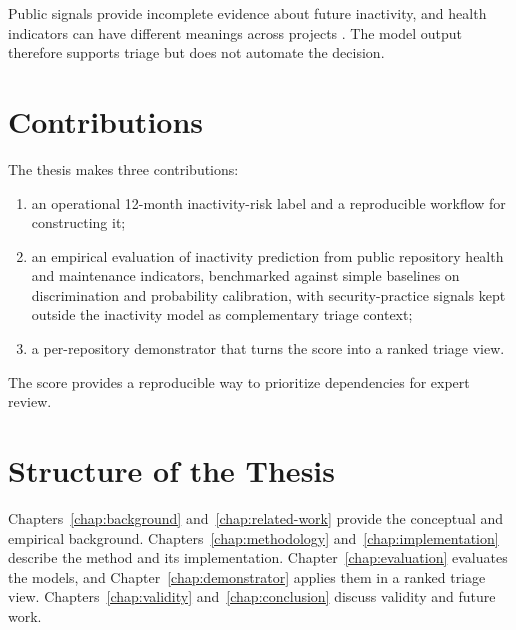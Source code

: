 Public signals provide incomplete evidence about future inactivity, and health
indicators can have different meanings across projects
\cite{yehudi2023contextfree}. The model output therefore supports triage but does
not automate the decision.

\section{Contributions}
\label{sec:intro-contributions}

The thesis makes three contributions:

\begin{enumerate}
    \item an operational 12-month inactivity-risk label and a reproducible workflow for constructing it;
    \item an empirical evaluation of inactivity prediction from public repository health and maintenance indicators, benchmarked against simple baselines on discrimination and probability calibration, with security-practice signals kept outside the inactivity model as complementary triage context;
    \item a per-repository demonstrator that turns the score into a ranked triage view.
\end{enumerate}

The score provides a reproducible way to prioritize dependencies for expert
review.

\section{Structure of the Thesis}
\label{sec:intro-structure}

Chapters~\ref{chap:background} and~\ref{chap:related-work} provide the conceptual
and empirical background. Chapters~\ref{chap:methodology}
and~\ref{chap:implementation} describe the method and its implementation.
Chapter~\ref{chap:evaluation} evaluates the models, and
Chapter~\ref{chap:demonstrator} applies them in a ranked triage view.
Chapters~\ref{chap:validity} and~\ref{chap:conclusion} discuss validity and future
work.
